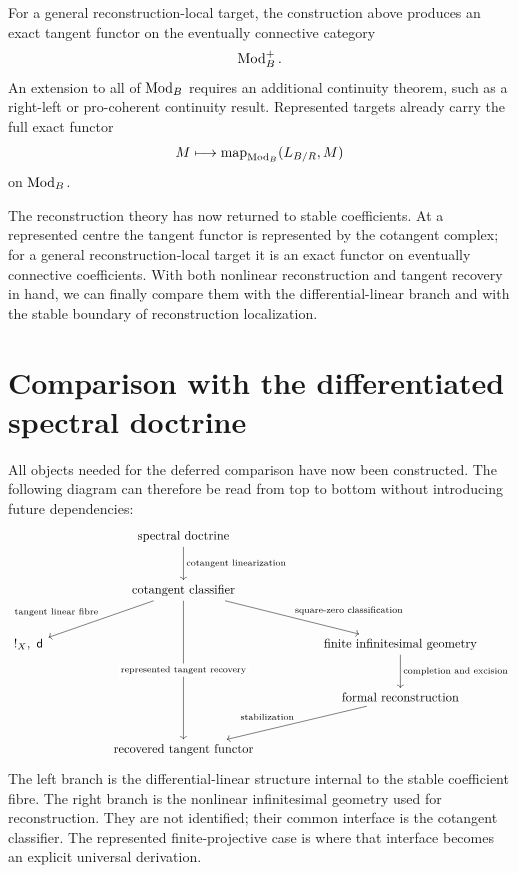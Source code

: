 \begin{remark}
\label{rem:tangent-functor-domain}
For a general reconstruction-local target, the construction above produces an
exact tangent functor on the eventually connective category
\[
    \operatorname{Mod}_B^+.
\]
An extension to all of \(\operatorname{Mod}_B\) requires an additional continuity theorem,
such as a right-left or pro-coherent continuity result. Represented targets
already carry the full exact functor
\[
    M\longmapsto\operatorname{map}_{\operatorname{Mod}_B}(L_{B/R},M)
\]
on \(\operatorname{Mod}_B\).
\end{remark}



The reconstruction theory has now returned to stable coefficients. At a represented
centre the tangent functor is represented by the cotangent complex; for a general
reconstruction-local target it is an exact functor on eventually connective
coefficients. With both nonlinear reconstruction and tangent recovery in hand, we can
finally compare them with the differential-linear branch and with the stable boundary of
reconstruction localization.

\section{Comparison with the differentiated spectral doctrine}
\label{sec:formal-reconstruction-comparisons}

All objects needed for the deferred comparison have now been constructed. The following
diagram can therefore be read from top to bottom without introducing future
dependencies:
\[
\begin{tikzcd}[column sep=huge,row sep=large]
    & \text{spectral doctrine}
        \arrow[d,"\text{cotangent linearization}"]
        &
    \\
    & \text{cotangent classifier}
        \arrow[dl,"\text{tangent linear fibre}"']
        \arrow[dr,"\text{square-zero classification}"]
        \arrow[ddd,"\text{represented tangent recovery}" description]
        &
    \\
    !_X,\ \mathsf d
        &
        &
    \text{finite infinitesimal geometry}
        \arrow[d,"\text{completion and excision}"]
    \\
        &
        &
    \text{formal reconstruction}
        \arrow[dl,"\text{stabilization}"']
    \\
    & \text{recovered tangent functor}
        &
\end{tikzcd}
\]
The left branch is the differential-linear structure internal to the stable coefficient
fibre. The right branch is the nonlinear infinitesimal geometry used for reconstruction.
They are not identified; their common interface is the cotangent classifier. The
represented finite-projective case is where that interface becomes an explicit universal
derivation.


